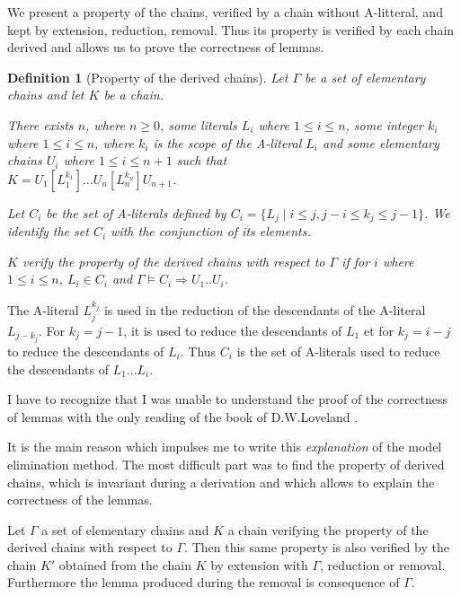\documentclass{article}
\newtheorem{definition}[theoreme]{Definition}
\begin{document}
We present a property of the chains, verified by a chain without A-litteral, and kept by extension, reduction, removal.
Thus its property is verified by each chain derived and allows us to prove the correctness of lemmas.



\begin{definition}[Property of the derived chains]\label{prop-chaine-derivee}
Let $\Gamma$ be a set of elementary chains and let $K$ be a chain.

There exists $n$, where $n \geq 0$,  some literals $L_i$ where $1 \leq i \leq n$, 
some integer $k_i$ where $1 \leq i \leq n$, where $k_i$ is the scope of the A-literal $L_i$
and some elementary chains
 $U_i$ where $1 \leq i \leq n+1$ such that \\$K = U_1[L_1^{k_1}]...U_n[L_n^{k_n}]U_{n+1}$.

Let $C_i$ be the set of A-literals defined by 
$C_i = \{ L_j \mid i \leq j, j-i \leq k_j \leq j-1\}$.
We identify the set $C_i$ with the  \emph{conjunction} of its elements.

$K$ verify the property of the derived chains with respect to $\Gamma$ if
for $i$  where $1 \leq i \leq n$, $L_i \in C_i$ and $\Gamma \models C_i \Rightarrow U_1.. U_i$.
\end{definition}

The A-literal $L_j^{k_j}$ is used in the reduction of the descendants of the A-literal $L_{j-k_j}$. 
For $k_j = j-1$, it is used to reduce the descendants of $L_1$ et for $k_j = i-j$ to reduce the descendants of $L_i$.
Thus $C_i$ is the set of A-literals used to reduce the descendants of $L_1 ...L_i$.

I have to recognize that I was unable to understand the proof of the correctness of lemmas with the only reading 
of the book of  D.W.Loveland \cite{Loveland1978}. 

It is the main reason which impulses me to write this \emph{explanation} of the model elimination method.
The most difficult part was to find the property of derived chains, which is invariant during a derivation and which allows
to explain the correctness of the lemmas.



\begin{lemme}\label{invariant-derivation}
Let $\Gamma$ a set of elementary chains and $K$ a chain verifying the property of the derived chains with respect to $\Gamma$.
Then this same property is also verified by the chain $K'$ obtained from the chain $K$ by extension with $\Gamma$, reduction 
or removal.
Furthermore the lemma produced during the removal is consequence of $\Gamma$.
\end{lemme}
\end{document}
